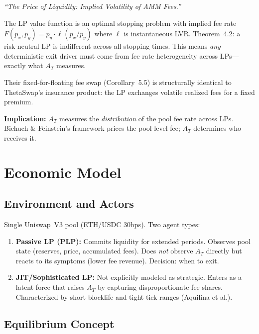\documentclass[11pt,a4paper]{article}
\begin{document}
\emph{``The Price of Liquidity: Implied Volatility of AMM Fees.''}

The LP value function is an optimal stopping problem with implied fee rate
$F(p_x, p_y) = p_y \cdot \ell(p_x/p_y)$ where $\ell$ is instantaneous LVR.
Theorem~4.2: a risk-neutral LP is indifferent across all stopping times.
This means \emph{any} deterministic exit driver must come from fee rate
heterogeneity across LPs---exactly what $A_T$ measures.

Their fixed-for-floating fee swap (Corollary~5.5) is structurally identical
to ThetaSwap's insurance product: the LP exchanges volatile realized fees
for a fixed premium.

\textbf{Implication:} $A_T$ measures the \emph{distribution} of the pool
fee rate across LPs. Bichuch \& Feinstein's framework prices the pool-level
fee; $A_T$ determines who receives it.


\section{Economic Model}\label{sec:economic-model}

\subsection{Environment and Actors}

Single Uniswap~V3 pool (ETH/USDC 30bps). Two agent types:

\begin{enumerate}
  \item \textbf{Passive LP (PLP):} Commits liquidity for extended periods.
        Observes pool state (reserves, price, accumulated fees). Does
        \emph{not} observe $A_T$ directly but reacts to its symptoms (lower
        fee revenue). Decision: when to exit.

  \item \textbf{JIT/Sophisticated LP:} Not explicitly modeled as strategic.
        Enters as a latent force that raises $A_T$ by capturing
        disproportionate fee shares. Characterized by short blocklife and
        tight tick ranges (Aquilina et al.).
\end{enumerate}

\subsection{Equilibrium Concept}
\end{document}
